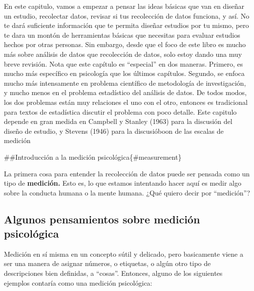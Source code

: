 \documentclass[]{book}
\begin{document}
En este capitulo, vamos a empezar a pensar las ideas básicas que van en diseñar un estudio, recolectar datos,
revisar si tus recolección de datos funciona, y así. No te dará suficiente información que te permita diseñar estudios por tu mismo, pero te dara un
montón de herramientas básicas que necesitas para evaluar estudios hechos por otras personas. Sin embargo, desde que el foco de este libro es
mucho más sobre análisis de datos que recolección de datos, solo estoy dando una muy breve revisión. Nota que este capítulo es ``especial''
en dos maneras. Primero, es mucho más específico en psicología que los últimos capítulos. Segundo, se enfoca mucho más intensamente en problema
científico de metodología de investigación, y mucho menos en el problema estadístico del análisis de datos. De todos modos, los dos problemas
están muy relaciones el uno con el otro, entonces es tradicional para textos de estadística discutir el problema con poco detalle. Este capitulo
depende en gran medida en Campbell y Stanley (1963) para la discusión del diseño de estudio, y Stevens (1946) para la discusióboon de las escalas de medición

\#\#Introducción a la medición psicológica\{\#measurement\}

La primera cosa para entender la recolección de datos puede ser pensada como un tipo de \textbf{medición.} Esto es, lo que estamos intentando hacer
aquí es medir algo sobre la conducta humana o la mente humana. ¿Qué quiero decir por ``medición''?

\hypertarget{algunos-pensamientos-sobre-mediciuxf3n-psicoluxf3gica}{%
\subsection{Algunos pensamientos sobre medición psicológica}\label{algunos-pensamientos-sobre-mediciuxf3n-psicoluxf3gica}}

Medición en sí misma en un concepto sútil y delicado, pero basicamente viene a ser una manera de asignar números, o etiquetas, o algún otro tipo de descripciones
bien definidas, a ``cosas''. Entonces, alguno de los siguientes ejemplos contaría como una medición psicológica:
\end{document}
